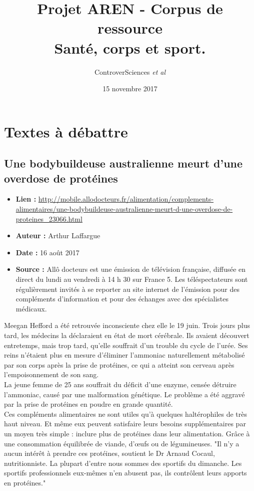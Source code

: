 \documentclass[8pt]{article}
\author{ControverSciences\textit{ et al} }
\title{Projet AREN - Corpus de ressource \\  Santé, corps et sport.}
\date{15 novembre 2017}
\begin{document}
\maketitle

\tableofcontents
\newpage
\section{Textes à débattre}
\subsection{Une bodybuildeuse australienne meurt d'une overdose de protéines}
\begin{itemize}
	\item \textbf{Lien : }  \url{http://mobile.allodocteurs.fr/alimentation/complements-alimentaires/une-bodybuildeuse-australienne-meurt-d-une-overdose-de-proteines_23066.html} 
	\item \textbf{Auteur : } Arthur Laffargue
	\item \textbf{Date : } 16 août 2017 
	\item \textbf{Source : } Allô docteurs est une émission de télévision française, diffusée en direct du lundi au vendredi à 14 h 30 sur France 5. Les téléspectateurs sont régulièrement invités à se reporter au site internet de l'émission pour des compléments d'information et pour des échanges avec des spécialistes médicaux.
\end{itemize}

Meegan Hefford a été retrouvée inconsciente chez elle le 19 juin. Trois jours plus tard, les médecins la déclaraient en état de mort cérébrale. Ils avaient découvert entretemps, mais trop tard, qu’elle souffrait d’un trouble du cycle de l’urée. Ses reins n’étaient plus en mesure d’éliminer l’ammoniac naturellement métabolisé par son corps après la prise de protéines, ce qui a atteint son cerveau après l’empoisonnement de son sang.\\

La jeune femme de 25 ans souffrait du déficit d’une enzyme, censée détruire l’ammoniac, causé par une malformation génétique. Le problème a été aggravé par la prise de protéines en poudre en grande quantité.\\

Ces compléments alimentaires ne sont utiles qu’à quelques haltérophiles de très haut niveau. Et même eux peuvent satisfaire leurs besoins supplémentaires par un moyen très simple : inclure plus de protéines dans leur alimentation. Grâce à une consommation équilibrée de viande, d’œufs ou de légumineuses. "Il n’y a aucun intérêt à prendre ces protéines, soutient le Dr Arnaud Cocaul, nutritionniste. La plupart d’entre nous sommes des sportifs du dimanche. Les sportifs professionnels eux-mêmes n’en abusent pas, ils contrôlent leurs apports en protéines."\\
\end{document}
